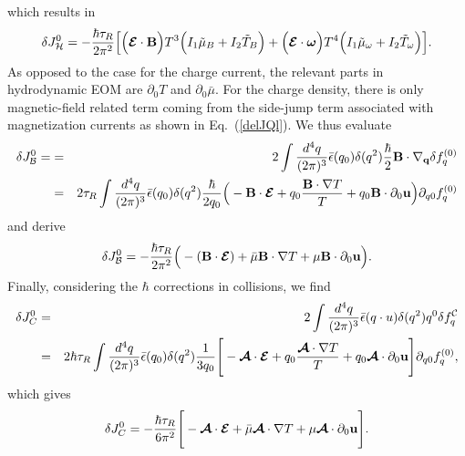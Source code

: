 \documentclass[aps,prd,showkeys,preprint,amsmath,amssymb,nofootinbib]{revtex4-1}
\begin{document}
which results in
\begin{eqnarray}
\delta J_{\mathcal{H}}^0
=-\frac{\hbar\tau_R}{2\pi^2}\Big[\Big(\bm{\mathcal{E}}\cdot {\bf B}\Big)T^3\Big(I_1\tilde{\mu}_B+I_2\tilde{T}_B\Big)
+\Big(\bm{\mathcal{E}}\cdot \bm{\omega}\Big)T^4\Big(I_1\tilde{\mu}_{\omega}+I_2\tilde{T}_{\omega}\Big)
\Big].
\end{eqnarray}
As opposed to the case for the charge current, the relevant parts in hydrodynamic EOM are $\partial_0T$ and $\partial_0\bar{\mu}$. For the charge density, there is only magnetic-field related term coming from the side-jump term associated with magnetization currents as shown in Eq.~(\ref{delJQl}). We thus evaluate
\begin{eqnarray}\nonumber
\delta J^0_{\mathcal{B}}=&=&2\int\frac{d^4q}{(2\pi)^3}\bar{\epsilon}(q_0)\delta(q^2)\frac{\hbar}{2}
{\bf B}\cdot\nabla_{\bf q}
\delta f^{(0)}_q
\\
&=&2\tau_R\int\frac{d^4q}{(2\pi)^3}\bar{\epsilon}(q_0)\delta(q^2)\frac{\hbar}{2q_0}
\Big(-{\bf B}\cdot \bm{\mathcal{E}}+q_0\frac{{\bf B}\cdot \nabla T}{T}+q_0{\bf B}\cdot\partial_0{\bf u}\Big)\partial_{q0}f^{(0)}_q
\end{eqnarray}
and derive
\begin{eqnarray}
\delta J^0_{\mathcal{B}}
=-\frac{\hbar\tau_R}{2\pi^2}
\Big(-({\bf B}\cdot \bm{\mathcal{E}})+\bar{\mu}{\bf B}\cdot\nabla T+\mu {\bf B}\cdot\partial_0{\bf u}\Big).
\end{eqnarray}
Finally, considering the $\hbar$ corrections in collisions, we find
\begin{eqnarray}\nonumber
\delta J_{C}^0&=&2\int\frac{d^4q}{(2\pi)^3}\bar{\epsilon}(q\cdot u)\delta(q^2)q^{0}\delta f^{\mathcal{C}}_q
\\
&=&2\hbar\tau_R\int\frac{d^4q}{(2\pi)^3}\bar{\epsilon}(q_0)\delta(q^2)
\frac{1}{3q_0}\Bigg[-\bm{\mathcal{A}}\cdot\bm{\mathcal{E}}+q_0\frac{\bm{\mathcal{A}}\cdot\nabla T}{T}+q_0\bm{\mathcal{A}}\cdot\partial_0{\bf u}\Bigg]\partial_{q0}f^{(0)}_q,
\end{eqnarray}
which gives
\begin{eqnarray}\label{J0Q}
\delta J_{C}^0=-\frac{\hbar\tau_R}{6\pi^2}\Bigg[-\bm{\mathcal{A}}\cdot\bm{\mathcal{E}}+\bar{\mu}\bm{\mathcal{A}}\cdot\nabla T+\mu\bm{\mathcal{A}}\cdot\partial_0{\bf u}\Bigg].
\end{eqnarray}
\end{document}

